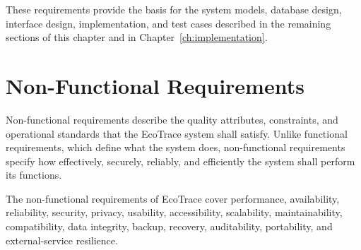 These requirements provide the basis for the system models, database design,
interface design, implementation, and test cases described in the remaining
sections of this chapter and in Chapter~\ref{ch:implementation}.

\section{Non-Functional Requirements}
\label{sec:nfr}

Non-functional requirements describe the quality attributes, constraints, and
operational standards that the EcoTrace system shall satisfy. Unlike functional
requirements, which define what the system does, non-functional requirements
specify how effectively, securely, reliably, and efficiently the system shall perform
its functions.

The non-functional requirements of EcoTrace cover performance, availability,
reliability, security, privacy, usability, accessibility, scalability, maintainability,
compatibility, data integrity, backup, recovery, auditability, portability, and
external-service resilience.

